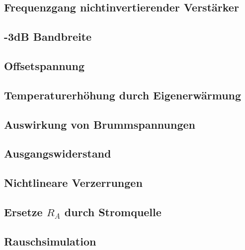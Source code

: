 \subsection{Frequenzgang nichtinvertierender Verstärker}

\subsection{-3dB Bandbreite}

\subsection{Offsetspannung}

\subsection{Temperaturerhöhung durch Eigenerwärmung}

\subsection{Auswirkung von Brummspannungen}

\subsection{Ausgangswiderstand}

\subsection{Nichtlineare Verzerrungen}

\subsection{Ersetze $R_A$ durch Stromquelle}

\subsection{Rauschsimulation}




